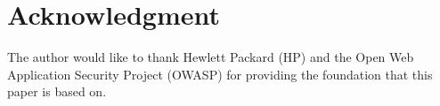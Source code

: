\documentclass[conference]{IEEEtran}
\begin{document}
%
\section*{Acknowledgment}
The author would like to thank Hewlett Packard (HP) and the Open Web 
Application Security Project (OWASP) for providing the foundation that this 
paper is based on.


\ifCLASSOPTIONcaptionsoff
  \newpage
\fi




\end{document}
